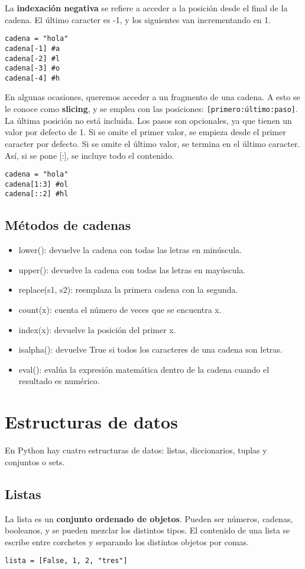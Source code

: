 La \textbf{indexación negativa} se refiere a acceder a la posición desde el final de la cadena. El último caracter es -1, y los siguientes van incrementando en 1. 
\begin{lstlisting}
cadena = "hola"
cadena[-1] #a
cadena[-2] #l
cadena[-3] #o
cadena[-4] #h
\end{lstlisting}

En algunas ocasiones, queremos acceder a un fragmento de una cadena. A esto se le conoce como \textbf{slicing}, y se emplea con las posiciones: \texttt{[primero:último:paso]}. La última posición no está incluida. Los pasos son opcionales, ya que tienen un valor por defecto de 1. Si se omite el primer valor, se empieza desde el primer caracter por defecto. Si se omite el último valor, se termina en el último caracter. Así, si se pone [:], se incluye todo el contenido.
\begin{lstlisting}
cadena = "hola"
cadena[1:3] #ol
cadena[::2] #hl
\end{lstlisting}

\subsection{Métodos de cadenas}
\begin{itemize}
\item lower(): devuelve la cadena con todas las letras en minúscula.
\item upper(): devuelve la cadena con todas las letras en mayúscula.
\item replace(s1, s2): reemplaza la primera cadena con la segunda.
\item count(x): cuenta el número de veces que se encuentra x.
\item index(x): devuelve la posición del primer x.
\item isalpha(): devuelve True si todos los caracteres de una cadena son letras.
\item eval(): evalúa la expresión matemática dentro de la cadena cuando el resultado es numérico.
\end{itemize}

\section{Estructuras de datos}
En Python hay cuatro estructuras de datos: listas, diccionarios, tuplas y conjuntos o sets. 

\subsection{Listas}
La lista es un \textbf{conjunto ordenado de objetos}. Pueden ser números, cadenas, booleanos, y se pueden mezclar los distintos tipos. El contenido de una lista se escribe entre corchetes y separando los distintos objetos por comas. 
\begin{lstlisting}
lista = [False, 1, 2, "tres"]
\end{lstlisting}

